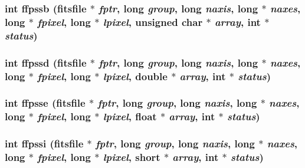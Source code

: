 \subsubsection{\setlength{\rightskip}{0pt plus 5cm}int ffpssb (\bf{fitsfile} $\ast$ {\em fptr}, long {\em group}, long {\em naxis}, long $\ast$ {\em naxes}, long $\ast$ {\em fpixel}, long $\ast$ {\em lpixel}, unsigned char $\ast$ {\em array}, int $\ast$ {\em status})}\label{test_2shm__client_2fitsio_8h_3c03b253046fc85ef6be13e34ac3d8b2}


\subsubsection{\setlength{\rightskip}{0pt plus 5cm}int ffpssd (\bf{fitsfile} $\ast$ {\em fptr}, long {\em group}, long {\em naxis}, long $\ast$ {\em naxes}, long $\ast$ {\em fpixel}, long $\ast$ {\em lpixel}, double $\ast$ {\em array}, int $\ast$ {\em status})}\label{test_2shm__client_2fitsio_8h_005342a1cc091d589dbc8dbfdc577e32}


\subsubsection{\setlength{\rightskip}{0pt plus 5cm}int ffpsse (\bf{fitsfile} $\ast$ {\em fptr}, long {\em group}, long {\em naxis}, long $\ast$ {\em naxes}, long $\ast$ {\em fpixel}, long $\ast$ {\em lpixel}, float $\ast$ {\em array}, int $\ast$ {\em status})}\label{test_2shm__client_2fitsio_8h_622b3a307ccbbbba93b0cf910a9c4091}


\subsubsection{\setlength{\rightskip}{0pt plus 5cm}int ffpssi (\bf{fitsfile} $\ast$ {\em fptr}, long {\em group}, long {\em naxis}, long $\ast$ {\em naxes}, long $\ast$ {\em fpixel}, long $\ast$ {\em lpixel}, short $\ast$ {\em array}, int $\ast$ {\em status})}\label{test_2shm__client_2fitsio_8h_2cf8bd9e8aec6e36d824b4fd9b34b9e0}


